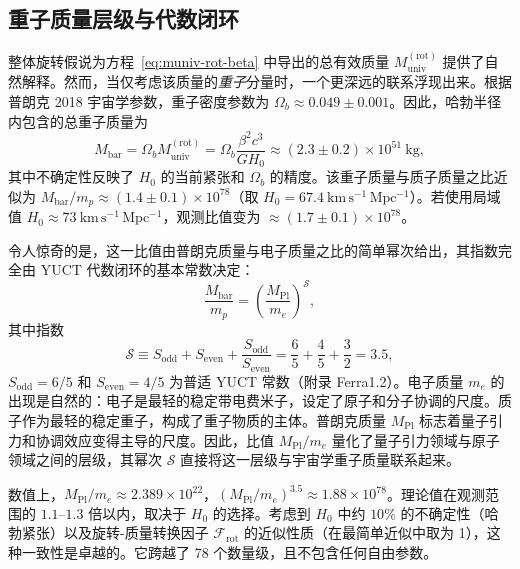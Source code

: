 \documentclass[11pt,a4paper]{article}
\newcommand{\Sodd}{S_{\mathrm{odd}}}
\newcommand{\Seven}{S_{\mathrm{even}}}
\begin{document}
	\subsection{重子质量层级与代数闭环}
	\label{subsec:baryon-hierarchy}
	
	整体旋转假说为方程~\eqref{eq:muniv-rot-beta} 中导出的总有效质量 \(M_{\mathrm{univ}}^{\mathrm{(rot)}}\) 提供了自然解释。然而，当仅考虑该质量的\emph{重子}分量时，一个更深远的联系浮现出来。根据普朗克 2018 宇宙学参数，重子密度参数为 \(\Omega_b \approx 0.049 \pm 0.001\)。因此，哈勃半径内包含的总重子质量为
	\begin{equation}
		M_{\mathrm{bar}} = \Omega_b M_{\mathrm{univ}}^{\mathrm{(rot)}} = \Omega_b \frac{\beta^2 c^3}{G H_0} \approx (2.3 \pm 0.2) \times 10^{51}\ \mathrm{kg},
	\end{equation}
	其中不确定性反映了 \(H_0\) 的当前紧张和 \(\Omega_b\) 的精度。该重子质量与质子质量之比近似为 \(M_{\mathrm{bar}}/m_p \approx (1.4 \pm 0.1) \times 10^{78}\)（取 \(H_0 = 67.4\ \mathrm{km\,s^{-1}\,Mpc^{-1}}\)）。若使用局域值 \(H_0 \approx 73\ \mathrm{km\,s^{-1}\,Mpc^{-1}}\)，观测比值变为 \(\approx (1.7 \pm 0.1) \times 10^{78}\)。
	
	令人惊奇的是，这一比值由普朗克质量与电子质量之比的简单幂次给出，其指数完全由 YUCT 代数闭环的基本常数决定：
	\begin{equation}
		\boxed{ \frac{M_{\mathrm{bar}}}{m_p} = \left( \frac{M_{\mathrm{Pl}}}{m_e} \right)^{\mathcal{S}} },
		\label{eq:baryon-hierarchy}
	\end{equation}
	其中指数
	\begin{equation}
		\mathcal{S} \equiv \Sodd + \Seven + \frac{\Sodd}{\Seven} = \frac{6}{5} + \frac{4}{5} + \frac{3}{2} = 3.5,
	\end{equation}
	\(\Sodd = 6/5\) 和 \(\Seven = 4/5\) 为普适 YUCT 常数（附录 Ferra1.2）。电子质量 \(m_e\) 的出现是自然的：电子是最轻的稳定带电费米子，设定了原子和分子协调的尺度。质子作为最轻的稳定重子，构成了重子物质的主体。普朗克质量 \(M_{\mathrm{Pl}}\) 标志着量子引力和协调效应变得主导的尺度。因此，比值 \(M_{\mathrm{Pl}}/m_e\) 量化了量子引力领域与原子领域之间的层级，其幂次 \(\mathcal{S}\) 直接将这一层级与宇宙学重子质量联系起来。
	
	数值上，\(M_{\mathrm{Pl}}/m_e \approx 2.389 \times 10^{22}\)，\((M_{\mathrm{Pl}}/m_e)^{3.5} \approx 1.88 \times 10^{78}\)。理论值在观测范围的 \(1.1\)–\(1.3\) 倍以内，取决于 \(H_0\) 的选择。考虑到 \(H_0\) 中约 \(10\%\) 的不确定性（哈勃紧张）以及旋转-质量转换因子 \(\mathcal{F}_{\mathrm{rot}}\) 的近似性质（在最简单近似中取为 1），这种一致性是卓越的。它跨越了 78 个数量级，且不包含任何自由参数。
	
\end{document}
